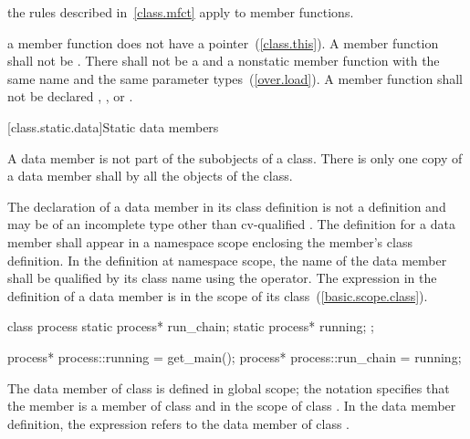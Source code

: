 \pnum
\enternote
the rules described in~\ref{class.mfct} apply to  member
functions.
\exitnote

\pnum
\enternote
a  member function does not have a 
pointer~(\ref{class.this}).
\exitnote
A  member function shall not be . There
shall not be a  and a nonstatic member function with the
same name and the same parameter types~(\ref{over.load}). A
 member function shall not be declared ,
, or .

[class.static.data]{Static data members}
%

\pnum
A  data member is not part of the subobjects of a class.
There is only one copy of a  data member shall by all
the objects of the class.

\pnum
{}%
%
The declaration of a  data member in its class definition
is not a definition and may be of an incomplete type other than
cv-qualified . The definition for a  data
member shall appear in a namespace scope enclosing the member's class
definition.
%
In the definition at namespace scope, the name of the 
data member shall be qualified by its class name using the \tcode{::}
operator. The  expression in the definition of a
 data member is in the scope of its
class~(\ref{basic.scope.class}).
%
\enterexample

\begin{codeblock}
class process {
	static process* run_chain;
	static process* running;
};

process* process::running = get_main();
process* process::run_chain = running;
\end{codeblock}

The  data member  of class
 is defined in global scope; the notation
 specifies that the member 
is a member of class  and in the scope of class
. In the  data member definition, the
 expression refers to the  data
member  of class .
\exitexample

